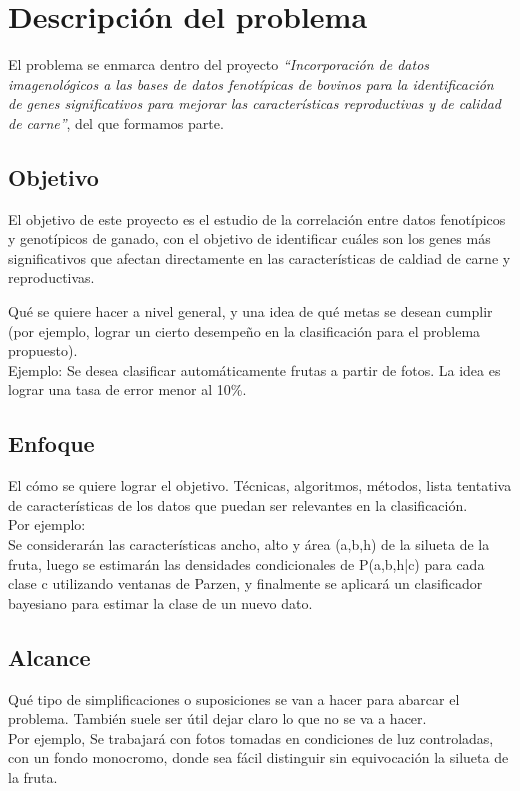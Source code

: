 \documentclass[12pt,a4paper,titlepage]{report}
\begin{document}
\chapter{Descripción del problema}

El problema se enmarca dentro del proyecto \emph{``Incorporación de datos imagenológicos a las bases de datos fenotípicas de bovinos para la identificación de genes significativos para mejorar las características reproductivas y de calidad de carne''}, del que formamos parte.

\section*{Objetivo}

El objetivo de este proyecto es el estudio de la correlación entre datos fenotípicos y genotípicos de ganado, con el objetivo de identificar cuáles son los genes más significativos que afectan directamente en las características de caldiad de carne y reproductivas. 

Qué se quiere hacer a nivel general, y una idea de qué metas se desean cumplir (por ejemplo, lograr un cierto desempeño en la clasificación para el problema propuesto).\\
Ejemplo: Se desea clasificar automáticamente frutas a partir de fotos. La idea es lograr una tasa de error menor al 10\%.

\section*{Enfoque}

El cómo se quiere lograr el objetivo. Técnicas, algoritmos, métodos, lista tentativa de características de los datos que puedan ser relevantes en la clasificación.\\
Por ejemplo:\\
    Se considerarán las características ancho, alto y área (a,b,h) de la silueta de la fruta, luego se estimarán las densidades condicionales de P(a,b,h|c) para cada clase c utilizando ventanas de Parzen, y finalmente se aplicará un clasificador bayesiano para estimar la clase de un nuevo dato.

\section*{Alcance}

Qué tipo de simplificaciones o suposiciones se van a hacer para abarcar el problema. También suele ser útil dejar claro lo que no se va a hacer.\\
Por ejemplo, Se trabajará con fotos tomadas en condiciones de luz controladas, con un fondo monocromo, donde sea fácil distinguir sin equivocación la silueta de la fruta.
\end{document}
